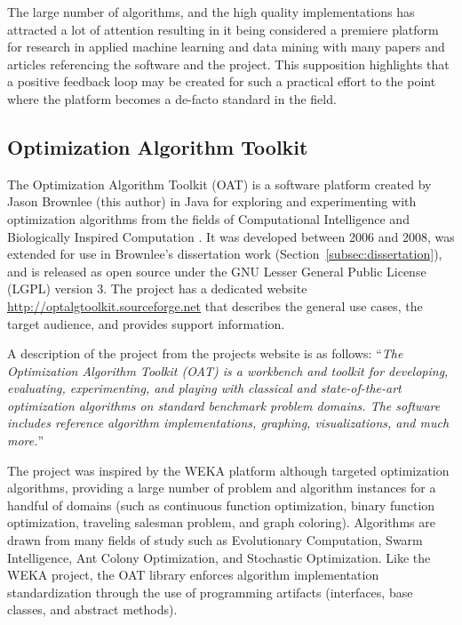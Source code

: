 \documentclass[a4paper, 11pt]{article}
\begin{document}
The large number of algorithms, and the high quality implementations has attracted a lot of attention resulting in it being considered a premiere platform for research in applied machine learning and data mining with many papers and articles referencing the software and the project. This supposition highlights that a positive feedback loop may be created for such a practical effort to the point where the platform becomes a de-facto standard in the field. 

% 
% 
\subsection{Optimization Algorithm Toolkit}
\label{subsec:oat}
The Optimization Algorithm Toolkit (OAT) is a software platform created by Jason Brownlee (this author) in Java for exploring and experimenting with optimization algorithms from the fields of Computational Intelligence and Biologically Inspired Computation \cite{Brownlee2007}. It was developed between 2006 and 2008, was extended for use in Brownlee's dissertation work (Section~\ref{subsec:dissertation}), and is released as open source under the GNU Lesser General Public License (LGPL) version 3. The project has a dedicated website \url{http://optalgtoolkit.sourceforge.net} that describes the general use cases, the target audience, and provides support information.

A description of the project from the projects website is as follows: ``\emph{The Optimization Algorithm Toolkit (OAT) is a workbench and toolkit for developing, evaluating, experimenting, and playing with classical and state-of-the-art optimization algorithms on standard benchmark problem domains. The software includes reference algorithm implementations, graphing, visualizations, and much more.}''

The project was inspired by the WEKA platform although targeted optimization algorithms, providing a large number of problem and algorithm instances for a handful of domains (such as continuous function optimization, binary function optimization, traveling salesman problem, and graph coloring). Algorithms are drawn from many fields of study such as Evolutionary Computation, Swarm Intelligence, Ant Colony Optimization, and Stochastic Optimization. Like the WEKA project, the OAT library enforces algorithm implementation standardization through the use of programming artifacts (interfaces, base classes, and abstract methods).
\end{document}
